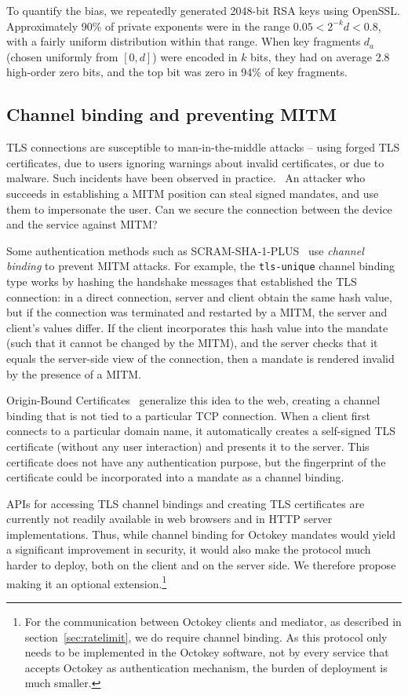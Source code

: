 To quantify the bias, we repeatedly generated 2048-bit RSA keys using OpenSSL. Approximately 90\% of
private exponents were in the range $0.05 < 2^{-k} d < 0.8$, with a fairly uniform distribution
within that range. When key fragments $d_a$ (chosen uniformly from $[0, d]$) were encoded in $k$
bits, they had on average 2.8 high-order zero bits, and the top bit was zero in 94\% of key
fragments.

\subsection{Channel binding and preventing MITM}\label{sec:channelbinding}

TLS connections are susceptible to man-in-the-middle attacks -- using forged TLS certificates, due
to users ignoring warnings about invalid certificates, or due to malware. Such incidents have been
observed in practice.~\cite{Huang14,Adkins11} An attacker who succeeds in establishing a MITM
position can steal signed mandates, and use them to impersonate the user. Can we secure the
connection between the device and the service against MITM?

Some authentication methods such as SCRAM-SHA-1-PLUS~\cite{SCRAM} use \emph{channel binding} to
prevent MITM attacks. For example, the \texttt{tls-unique} channel binding type works by hashing the
handshake messages that established the TLS connection: in a direct connection, server and client
obtain the same hash value, but if the connection was terminated and restarted by a MITM, the server
and client's values differ. If the client incorporates this hash value into the mandate (such that
it cannot be changed by the MITM), and the server checks that it equals the server-side view of the
connection, then a mandate is rendered invalid by the presence of a MITM.

Origin-Bound Certificates~\cite{Dietz12} generalize this idea to the web, creating a channel
binding that is not tied to a particular TCP connection. When a client first connects to a
particular domain name, it automatically creates a self-signed TLS certificate (without any user
interaction) and presents it to the server. This certificate does not have any authentication
purpose, but the fingerprint of the certificate could be incorporated into a mandate as a channel
binding.

APIs for accessing TLS channel bindings and creating TLS certificates are currently not readily
available in web browsers and in HTTP server implementations. Thus, while channel binding for
Octokey mandates would yield a significant improvement in security, it would also make the protocol
much harder to deploy, both on the client and on the server side. We therefore propose making it an
optional extension.\footnote{For the communication between Octokey clients and mediator, as
described in section~\ref{sec:ratelimit}, we do require channel binding. As this protocol only needs
to be implemented in the Octokey software, not by every service that accepts Octokey as
authentication mechanism, the burden of deployment is much smaller.}

